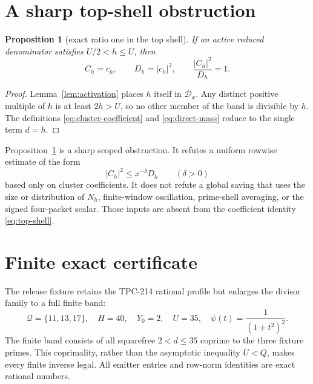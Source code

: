\documentclass[11pt]{article}
\newtheorem{proposition}[theorem]{Proposition}
\theoremstyle{definition}
\theoremstyle{remark}
\newcommand{\Dd}{\mathcal D}
\newcommand{\QQ}{\mathcal Q}
\begin{document}
\section{A sharp top-shell obstruction}

\begin{proposition}[exact ratio one in the top shell]
\label{prop:top-shell}
If an active reduced denominator satisfies $U/2<h\le U$, then
\begin{equation}
 C_h=c_h,\qquad D_h=|c_h|^2,
 \qquad \frac{|C_h|^2}{D_h}=1.
 \label{eq:top-shell}
\end{equation}
\end{proposition}

\begin{proof}
Lemma~\ref{lem:activation} places $h$ itself in $\Dd_x$.  Any distinct
positive multiple of $h$ is at least $2h>U$, so no other member of the band is
divisible by $h$.  The definitions \eqref{eq:cluster-coefficient} and
\eqref{eq:direct-mass} reduce to the single term $d=h$.
\end{proof}

Proposition~\ref{prop:top-shell} is a sharp scoped obstruction.  It refutes a
uniform rowwise estimate of the form
\begin{equation}
 |C_h|^2\le x^{-\delta}D_h
 \qquad(\delta>0)
 \label{eq:forbidden-saving}
\end{equation}
based only on cluster coefficients.  It does not refute a global saving that
uses the size or distribution of $N_h$, finite-window oscillation, prime-shell
averaging, or the signed four-packet scalar.  Those inputs are absent from the
coefficient identity \eqref{eq:top-shell}.

\section{Finite exact certificate}

The release fixture retains the TPC-214 rational profile but enlarges the
divisor family to a full finite band:
\begin{equation}
 \QQ=\{11,13,17\},\quad H=40,\quad Y_0=2,\quad U=35,
 \quad \psi(t)=\frac1{(1+t^2)^2}.
 \label{eq:fixture}
\end{equation}
The finite band consists of all squarefree $2<d\le35$ coprime to the three
fixture primes.  This coprimality, rather than the asymptotic inequality
$U<Q$, makes every finite inverse legal.  All emitter entries and row-norm
identities are exact rational numbers.
\end{document}
